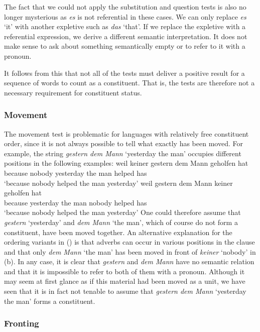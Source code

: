 The fact that we could not apply the substitution and question tests is also no longer mysterious as
\emph{es} is not referential in these cases. We can only replace \emph{es} `it' with another expletive such
as \emph{das} `that'. If we replace the expletive with a referential expression, we derive a different semantic
interpretation. It does not make sense to ask about something semantically empty or to refer to it with
a pronoun.

It follows from this that not all of the tests must deliver a positive result for a sequence of words to count as a constituent.
That is, the tests are therefore not a necessary requirement for constituent status.

\subsubsection{Movement}

The movement test is problematic for languages with relatively free constituent order, since it is not
always possible to tell what exactly has been moved. For example, the string \emph{gestern dem Mann}
`yesterday the man' occupies different positions in the following examples:
\eal
\ex 
\gll weil keiner gestern dem Mann geholfen hat\\
     because nobody yesterday the man helped has\\
\glt `because nobody helped the man yesterday'
\ex 
\gll weil gestern dem Mann keiner geholfen hat\\
	 because yesterday the man nobody helped has\\
\glt `because nobody helped the man yesterday'
\zl
One could therefore assume that \emph{gestern} `yesterday' and \emph{dem Mann} `the man', which of course do not form a constituent, 
have been moved together. An alternative explanation for the ordering variants in () is that adverbs can occur in various positions
in the clause and that only \emph{dem Mann} `the man' has been moved in front of \emph{keiner}
`nobody' in (b). In any case, it is clear that \emph{gestern} and \emph{dem Mann}
have no semantic relation and that it is impossible to refer to both of them with a pronoun. Although it may seem at first glance as if this material had been moved as
a unit, we have seen that it is in fact not tenable to assume that \emph{gestern dem Mann} `yesterday the man' forms a constituent.

\subsubsection{Fronting}
\label{sec-konst-test-probleme-voranstellung} 

